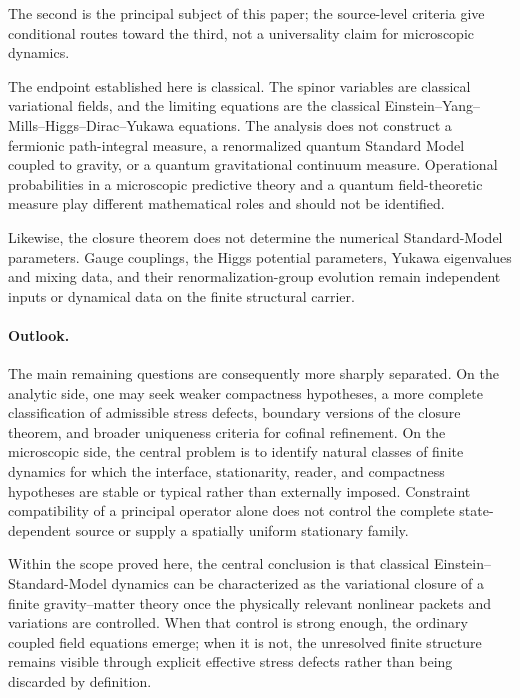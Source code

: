 \documentclass[11pt]{article}
\numberwithin{equation}{section}
\theoremstyle{definition}
\theoremstyle{remark}
\begin{document}
The second is the principal subject of this paper; the source-level
criteria give conditional routes toward the third, not a universality
claim for microscopic dynamics.

The endpoint established here is classical.  The spinor variables are
classical variational fields, and the limiting equations are the classical
Einstein--Yang--Mills--Higgs--Dirac--Yukawa equations.  The analysis does not
construct a fermionic path-integral measure, a renormalized quantum
Standard Model coupled to gravity, or a quantum gravitational continuum
measure.  Operational probabilities in a microscopic predictive theory and a
quantum field-theoretic measure play different mathematical roles and should
not be identified.

Likewise, the closure theorem does not determine the numerical Standard-Model
parameters.  Gauge couplings, the Higgs potential parameters, Yukawa
eigenvalues and mixing data, and their renormalization-group evolution remain
independent inputs or dynamical data on the finite structural carrier.

\paragraph{Outlook.}

The main remaining questions are consequently more sharply separated.
On the analytic side, one may seek weaker compactness hypotheses, a more
complete classification of admissible stress defects, boundary versions of
the closure theorem, and broader uniqueness criteria for cofinal refinement.
On the microscopic side, the central problem is to identify natural classes
of finite dynamics for which the interface, stationarity, reader, and
compactness hypotheses are stable or typical rather than externally imposed.  Constraint
compatibility of a principal operator alone does not control the complete
state-dependent source or supply a spatially uniform stationary family.

Within the scope proved here, the central conclusion is that classical
Einstein--Standard-Model dynamics can be characterized as the variational
closure of a finite gravity--matter theory once the physically relevant
nonlinear packets and variations are controlled.  When that control is
strong enough, the ordinary coupled field equations emerge; when it is not,
the unresolved finite structure remains visible through explicit effective
stress defects rather than being discarded by definition.
\end{document}
